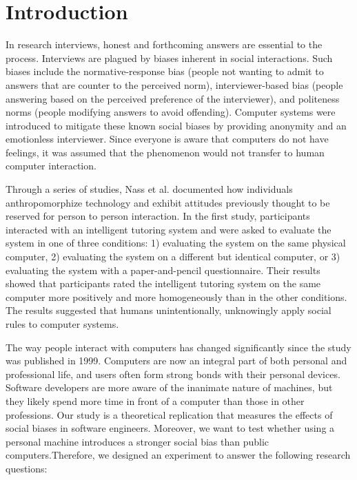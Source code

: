 \documentclass{sig-alternate-05-2015}
\begin{document}

%
%
\printccsdesc


\section{Introduction}
In research interviews, honest and forthcoming answers are essential to the process. Interviews are plagued by biases inherent in social interactions. Such biases include the normative-response bias (people not wanting to admit to answers that are counter to the perceived norm), interviewer-based bias (people answering based on the perceived preference of the interviewer), and politeness norms (people modifying answers to avoid offending). Computer systems were introduced to mitigate these known social biases by providing anonymity and an emotionless interviewer.  Since everyone is aware that computers do not have feelings, it was assumed that the phenomenon would not transfer to human computer interaction. 

Through a series of studies, Nass et al. documented how individuals anthropomorphize technology and exhibit attitudes previously thought to be reserved for person to person interaction\cite{nass1999people}\cite{reeves1996people}.  In the first study, participants interacted with an intelligent tutoring system and were asked to evaluate the system in one of three conditions: 1) evaluating the system on the same physical computer, 2) evaluating the system on a different but identical computer, or 3) evaluating the system with a paper-and-pencil questionnaire. Their results showed that participants rated the intelligent tutoring system on the same computer more positively and more homogeneously than in the other conditions. The results suggested that humans unintentionally, unknowingly apply social rules to computer systems.  


The way people interact with computers has changed significantly since the study was published  in 1999.  Computers are now an integral part of both personal and professional life, and users often form strong bonds with their personal devices.  Software developers are more aware of the inanimate nature of machines, but they likely spend more time in front of a computer than those in other professions. Our study is a theoretical replication that measures the effects of social biases in software engineers.  Moreover, we want to test whether using a personal machine introduces a stronger social bias than public computers.Therefore, we designed an experiment to answer the following research questions:
\end{document}
